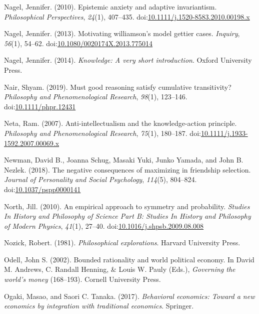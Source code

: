 \documentclass[
  10pt,
  letterpaper,
  twoside]{scrbook}
\newlength{\cslhangindent}
\newenvironment{CSLReferences}[2] %
 {\begin{list}{}{%
  \setlength{\itemindent}{0pt}
  \setlength{\leftmargin}{0pt}
  \setlength{\parsep}{0pt}
  \ifodd #1
   \setlength{\leftmargin}{\cslhangindent}
   \setlength{\itemindent}{-1\cslhangindent}
  \fi
  \setlength{\itemsep}{#2\baselineskip}}}
 {\end{list}}
\begin{document}
\begin{CSLReferences}{1}{0}
Nagel, Jennifer. (2010). Epistemic anxiety and adaptive invariantism.
\emph{Philosophical Perspectives}, \emph{24}(1), 407--435.
doi:\href{https://doi.org/10.1111/j.1520-8583.2010.00198.x}{10.1111/j.1520-8583.2010.00198.x}

Nagel, Jennifer. (2013). Motivating williamson's model gettier cases.
\emph{Inquiry}, \emph{56}(1), 54--62.
doi:\href{https://doi.org/10.1080/0020174X.2013.775014}{10.1080/0020174X.2013.775014}

Nagel, Jennifer. (2014). \emph{Knowledge: A very short introduction}.
Oxford University Press.

Nair, Shyam. (2019). Must good reasoning satisfy cumulative
transitivity? \emph{Philosophy and Phenomenological Research},
\emph{98}(1), 123--146.
doi:\href{https://doi.org/10.1111/phpr.12431}{10.1111/phpr.12431}

Neta, Ram. (2007). Anti-intellectualism and the knowledge-action
principle. \emph{Philosophy and Phenomenological Research},
\emph{75}(1), 180--187.
doi:\href{https://doi.org/10.1111/j.1933-1592.2007.00069.x}{10.1111/j.1933-1592.2007.00069.x}

Newman, David B., Joanna Schug, Masaki Yuki, Junko Yamada, and John B.
Nezlek. (2018). The negative consequences of maximizing in friendship
selection. \emph{Journal of Personality and Social Psychology},
\emph{114}(5), 804--824.
doi:\href{https://doi.org/10.1037/pspp0000141}{10.1037/pspp0000141}

North, Jill. (2010). An empirical approach to symmetry and probability.
\emph{Studies In History and Philosophy of Science Part B: Studies In
History and Philosophy of Modern Physics}, \emph{41}(1), 27--40.
doi:\href{https://doi.org/10.1016/j.shpsb.2009.08.008}{10.1016/j.shpsb.2009.08.008}

Nozick, Robert. (1981). \emph{Philosophical explorations}. Harvard
University Press.

Odell, John S. (2002). Bounded rationality and world political economy.
In David M. Andrews, C. Randall Henning, \& Louis W. Pauly (Eds.),
\emph{Governing the world's money} (168--193). Cornell University Press.

Ogaki, Masao, and Saori C. Tanaka. (2017). \emph{Behavioral economics:
Toward a new economics by integration with traditional economics}.
Springer.


\end{CSLReferences}
\end{document}
